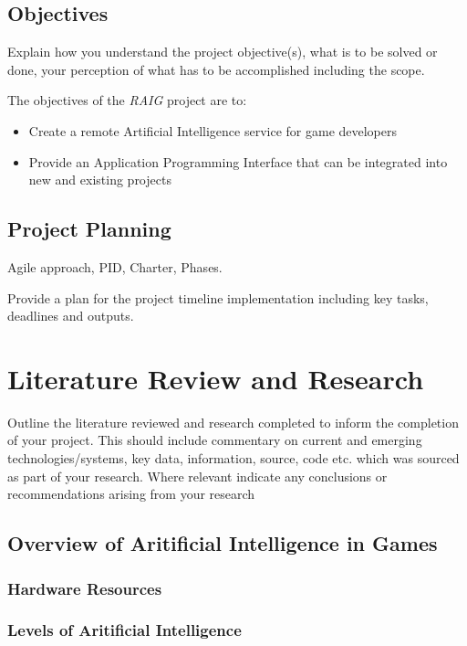 \documentclass[12pt,a4paper,titlepage]{article}
\begin{document}
\subsection{Objectives}

Explain how you understand the project objective(s), what is to be solved or done, your perception of what has to be accomplished including the scope. 

The objectives of the \textit{RAIG} project are to:

\begin{itemize}
\item{Create a remote Artificial Intelligence service for game developers}
\item{Provide an Application Programming Interface that can be integrated into new and existing projects}

\end{itemize}

\subsection{Project Planning}
Agile approach, PID, Charter, Phases.

Provide a plan for the project timeline implementation including key tasks, deadlines and outputs.

\section{Literature Review and Research}
Outline the literature reviewed and research completed to inform the completion of your project.  This should include commentary on current and emerging technologies/systems, key data, information, source, code etc. which was sourced as part of your research.  Where relevant indicate any conclusions or recommendations arising from your research

\subsection{Overview of Aritificial Intelligence in Games}

\subsubsection{Hardware Resources}

\subsubsection{Levels of Aritificial Intelligence}
\end{document}
